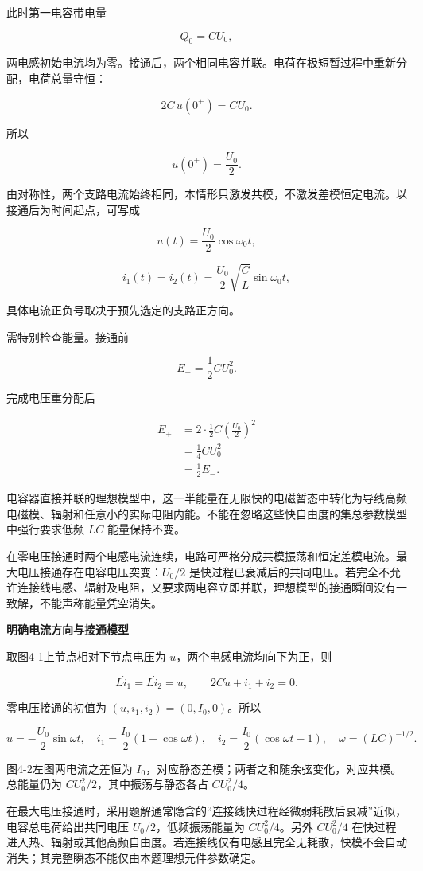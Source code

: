 \documentclass[12pt,a4paper,UTF8]{ctexart}
\begin{document}
此时第一电容带电量

\[Q_0=CU_0,\]

两电感初始电流均为零。接通后，两个相同电容并联。电荷在极短暂过程中重新分配，电荷总量守恒：

\[2C\,u(0^+)=CU_0.\]

所以

\[u(0^+)=\frac{U_0}{2}.\]

由对称性，两个支路电流始终相同，本情形只激发共模，不激发差模恒定电流。以接通后为时间起点，可写成

\[u(t)=\frac{U_0}{2}\cos\omega_0t,\]

\[i_1(t)=i_2(t)=\frac{U_0}{2}\sqrt{\frac CL}\sin\omega_0t,\]

具体电流正负号取决于预先选定的支路正方向。

需特别检查能量。接通前

\[E_-=\frac12CU_0^2.\]

完成电压重分配后

\[\begin{aligned}
E_+
&=2\cdot\frac12C\left(\frac{U_0}{2}\right)^2\\
&=\frac14CU_0^2\\
&=\frac12E_-.
\end{aligned}\]

电容器直接并联的理想模型中，这一半能量在无限快的电磁暂态中转化为导线高频电磁模、辐射和任意小的实际电阻内能。不能在忽略这些快自由度的集总参数模型中强行要求低频
\(LC\) 能量保持不变。

在零电压接通时两个电感电流连续，电路可严格分成共模振荡和恒定差模电流。最大电压接通存在电容电压突变：\(U_0/2\)
是快过程已衰减后的共同电压。若完全不允许连接线电感、辐射及电阻，又要求两电容立即并联，理想模型的接通瞬间没有一致解，不能声称能量凭空消失。

\textbf{明确电流方向与接通模型}

取图4-1上节点相对下节点电压为 \(u\)，两个电感电流均向下为正，则

\[L\dot i_1=L\dot i_2=u,\qquad2C\dot u+i_1+i_2=0.\]

零电压接通的初值为 \((u,i_1,i_2)=(0,I_0,0)\)。所以

\[u=-\frac{U_0}{2}\sin\omega t,\quad
i_1=\frac{I_0}{2}(1+\cos\omega t),\quad
i_2=\frac{I_0}{2}(\cos\omega t-1),\quad\omega=(LC)^{-1/2}.\]

图4-2左图两电流之差恒为
\(I_0\)，对应静态差模；两者之和随余弦变化，对应共模。总能量仍为
\(CU_0^2/2\)，其中振荡与静态各占 \(CU_0^2/4\)。

在最大电压接通时，采用题解通常隐含的``连接线快过程经微弱耗散后衰减''近似，电容总电荷给出共同电压
\(U_0/2\)，低频振荡能量为 \(CU_0^2/4\)。另外 \(CU_0^2/4\)
在快过程进入热、辐射或其他高频自由度。若连接线仅有电感且完全无耗散，快模不会自动消失；其完整瞬态不能仅由本题理想元件参数确定。
\end{document}
